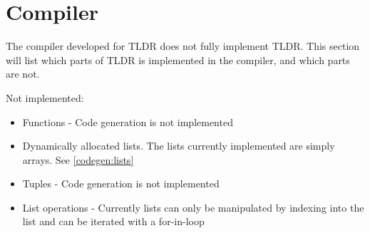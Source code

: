 \section{Compiler}

The compiler developed for TLDR does not fully implement TLDR. This section will list which parts of TLDR is implemented in the compiler, and which parts are not.

Not implemented:

\begin{itemize}
\item Functions - Code generation is not implemented
\item Dynamically allocated lists. The lists currently implemented are simply arrays. See \cref{codegen:lists}
\item Tuples - Code generation is not implemented
\item List operations - Currently lists can only be manipulated by indexing into the list and can be iterated with a for-in-loop
\end{itemize}